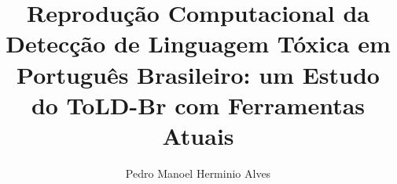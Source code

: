\documentclass[sigconf, nonacm]{acmart}
\begin{document}
\title{Reprodução Computacional da Detecção de Linguagem Tóxica em Português Brasileiro: um Estudo do ToLD-Br com Ferramentas Atuais}


\author{Pedro Manoel Herminio Alves}



\renewcommand{\shortauthors}{P.~M.~H. Alves}
\end{document}
